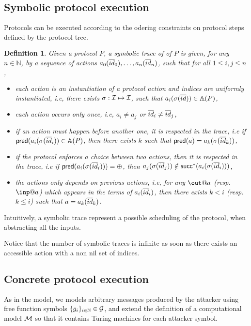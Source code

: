 \documentclass[a4paper]{article}
\newtheorem{definition}{Definition}
\theoremstyle{remark}
\begin{document}
\subsection{Symbolic protocol execution}

Protocols can be executed according to the odering constraints on protocol steps defined by the protocol tree.
\begin{definition}
  Given a protocol $P$, a symbolic trace of of $P$ is given, for any $n\in\mathbb{N}$, by a sequence of actions $a_0 (\overline{id}_0),\dots,a_n (\overline{id}_n)$, such that for all $1 \leq i,j \leq n$,
  \begin{itemize}
    \item each action is an instantiation of a protocol action and indices are uniformly instantiated, i.e, there exists $\sigma : \mathcal{I} \mapsto \mathcal{I}$, such that $a_i (\sigma (\overline{id})) \in\mathbb{A}(P)$,
    \item each action occurs only once, i.e, $a_i \neq{} a_j$ or $\overline{id}_i \neq\overline{id}_j$,
    \item if an action must happen before another one, it is respected in the trace, i.e
      if $\textsf{pred} (a_i(\sigma(\overline{id}_i)) \in \mathbb{A}(P)$, then there exists $k$ such that $\textsf{pred}(a) = a_k(\sigma(\overline{id}_k))$,
    \item if the protocol enforces a choice between two actions, then it is respected in the trace, i.e if $\textsf{pred}(a_i(\sigma(\overline{id}_i))) = \oplus$, then $a_j(\sigma(\overline{id}_j)) \notin \textsf{succ}^*(a_i(\sigma(\overline{id}_i)))$,
      \item the actions only depends on previous actions, i.e, for any $\out@a$ (resp. $\inp@a$) which appears in the terms of $a_i(\overline{id}_i)$, then there exists $k < i$ (resp. $k \leq i$) such that $a = a_k(\overline{id}_k)$.
      \end{itemize}
\end{definition}
Intuitively, a symbolic trace represent a possible scheduling of the protocol, when abstracting all the inputs.

Notice that the number of symbolic traces is infinite as soon as there exists an accessible action with a non nil set of indices.


\subsection{Concrete protocol execution}
As in the \BC model, we models arbitrary messages produced by the attacker using free function symbols $\{g_i\}_{i \in \mathbb{N}} \in \mathcal{G}$, and extend the definition of a computational model $\mathcal{M}$ so that it contains Turing machines for each attacker symbol.
\end{document}
